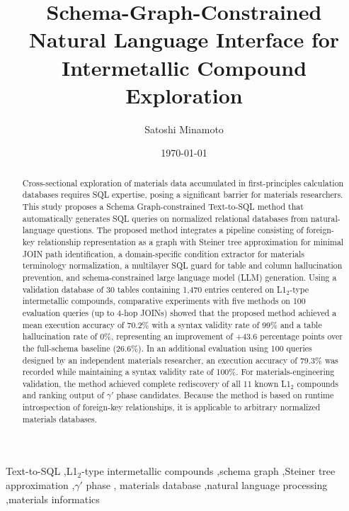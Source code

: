\documentclass[5p,twocolumn]{elsarticle}
\begin{document}
\begin{frontmatter}

\title{Schema-Graph-Constrained Natural Language Interface for Intermetallic Compound Exploration}

\author[nims]{Satoshi Minamoto}
\address[nims]{National Institute for Materials Science (NIMS),
  1-2-1 Sengen, Tsukuba, Ibaraki 305-0047, Japan}

\date{\today}

\begin{abstract}
Cross-sectional exploration of materials data accumulated in first-principles calculation databases
requires SQL expertise, posing a significant barrier for materials researchers.
This study proposes a Schema Graph-constrained Text-to-SQL method
that automatically generates SQL queries on normalized relational databases from natural-language questions.
The proposed method integrates a pipeline consisting of
foreign-key relationship representation as a graph with Steiner tree approximation for minimal JOIN path identification,
a domain-specific condition extractor for materials terminology normalization,
a multilayer SQL guard for table and column hallucination prevention,
and schema-constrained large language model (LLM) generation.
Using a validation database of 30 tables containing 1{,}470 entries centered on L1$_2$-type intermetallic compounds,
comparative experiments with five methods on 100 evaluation queries (up to 4-hop JOINs) showed that
the proposed method achieved a mean execution accuracy of 70.2\% with a syntax validity rate of 99\% and a table hallucination rate of 0\%,
representing an improvement of +43.6 percentage points over the full-schema baseline (26.6\%).
In an additional evaluation using 100 queries designed by an independent materials researcher,
an execution accuracy of 79.3\% was recorded while maintaining a syntax validity rate of 100\%.
For materials-engineering validation, the method achieved complete rediscovery of all 11 known L1$_2$ compounds
and ranking output of $\gamma'$ phase candidates.
Because the method is based on runtime introspection of foreign-key relationships,
it is applicable to arbitrary normalized materials databases.

\end{abstract}

\begin{keyword}
Text-to-SQL \sep L1$_2$-type intermetallic compounds \sep schema graph \sep Steiner tree approximation \sep $\gamma'$ phase \sep
materials database \sep natural language processing \sep materials informatics
\end{keyword}

\end{frontmatter}
\end{document}
